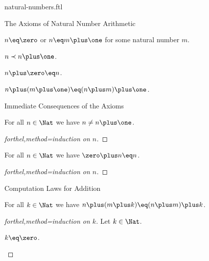 \documentclass{naproche-library}
\begin{document}
\begin{smodule}[title=Natural Numbers]{natural-numbers.ftl}
\begin{sfragment}{The Axioms of Natural Number Arithmetic}
  \begin{axiom}[forthel,title=Peano Axiom III,id=NatNumberIsZeroOrSuccessorAx]
    $n\eq\zero$ or $n\eq m\plus\one$ for some natural number $m$.
  \end{axiom}

  \begin{axiom}[forthel,title=Induction Axiom,id=InductionAx]
    $n\prec n\plus\one$.
  \end{axiom}

  \begin{axiom}[forthel,title=Addition Axiom I,id=AdditionWithZeroAx]
    $n\plus\zero\eq n$.
  \end{axiom}

  \begin{axiom}[forthel,title=Addition Axiom II,id=AdditionWithSuccessorAx]
    $n\plus(m\plus\one)\eq(n\plus m)\plus\one$.
  \end{axiom}
\end{sfragment}

\begin{sfragment}{Immediate Consequences of the Axioms}
  \begin{proposition}[forthel,id=NatNumberIsNotItsOwnSuccessorProp]
    For all $n\in\Nat$ we have $n\neq n\plus\one$.
  \end{proposition}
  \begin{proof}[forthel,method=induction on $n$]\end{proof}

  \begin{proposition}[forthel,id=ZeroIsLeftIdentityOfPlusProp]
    For all $n\in\Nat$ we have $\zero\plus n\eq n$.
  \end{proposition}
  \begin{proof}[forthel,method=induction on $n$]\end{proof}
\end{sfragment}

\begin{sfragment}{Computation Laws for Addition}
  \begin{proposition}[forthel,title=Associativity,id=PlusIsAssociativeProp]
    For all $k\in\Nat$ we have $n\plus(m\plus k)\eq(n\plus m)\plus k$.
  \end{proposition}
  \begin{proof}[forthel,method=induction on $k$]
    Let $k\in\Nat$.

    \begin{case}{$k\eq\zero$.}\end{case}


\end{proof}
\end{sfragment}
\end{smodule}
\end{document}
